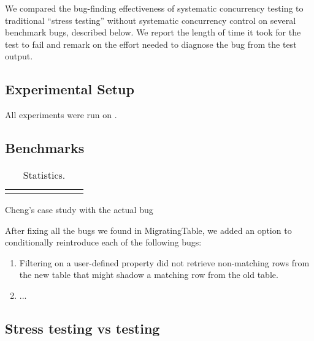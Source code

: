 We compared the bug-finding effectiveness of \psharp systematic concurrency testing to traditional ``stress testing'' without systematic concurrency control on several benchmark bugs, described below.  We report the length of time it took for the test to fail and remark on the effort needed to diagnose the bug from the test output. 

\subsection{Experimental Setup}

All experiments were run on . 

\subsection{Benchmarks}

\newcommand{\colspacing}{\hspace{1.8em}}
\begin{table}[t]
\small
\centering
\setlength{\tabcolsep}{0.3em}
\label{tab:stats}
\begin{tabular}{l rrrrr rr}
\centering

\end{tabular}
\caption{Statistics.}
\end{table}


Cheng's case study with the actual bug

After fixing all the bugs we found in MigratingTable, we added an option to conditionally reintroduce each of the following bugs:
\begin{enumerate}
\item Filtering on a user-defined property did not retrieve non-matching rows from the new table that might shadow a matching row from the old table.
\item ...
\end{enumerate}

\subsection{Stress testing vs \psharp testing}

